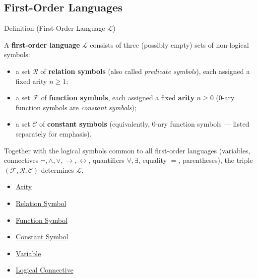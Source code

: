 

\vspace{0.5em}


\subsection*{First-Order Languages}

\begin{definitionbox}{Definition (First-Order Language $\mathcal{L}$)}
\begin{definition}\label{def:first-order-language}
A \textbf{first-order language} $\mathcal{L}$ consists of three (possibly
empty) sets of non-logical symbols:
\begin{itemize}
  \item a set $\mathcal{R}$ of \textbf{relation symbols} (also called
        \emph{predicate symbols}), each assigned a fixed arity $n \geq 1$;
  \item a set $\mathcal{F}$ of \textbf{function symbols}, each assigned a
        fixed \textbf{arity} $n \geq 0$ (0-ary function symbols are
        \emph{constant symbols});
  \item a set $\mathcal{C}$ of \textbf{constant symbols} (equivalently,
        0-ary function symbols --- listed separately for emphasis).
\end{itemize}
Together with the logical symbols common to all first-order languages
(variables, connectives $\lnot, \land, \lor, \to, \leftrightarrow$,
quantifiers $\forall, \exists$, equality $=$, parentheses), the triple
$(\mathcal{F}, \mathcal{R}, \mathcal{C})$ determines $\mathcal{L}$.
\end{definition}
\end{definitionbox}

\begin{dependencies}
\begin{itemize}
  \item \hyperref[def:arity]{Arity}
  \item \hyperref[def:relation-symbol]{Relation Symbol}
  \item \hyperref[def:function-symbol]{Function Symbol}
  \item \hyperref[def:constant-symbol]{Constant Symbol}
  \item \hyperref[def:variable]{Variable}
  \item \hyperref[def:logical-connective]{Logical Connective}
\end{itemize}
\end{dependencies}


